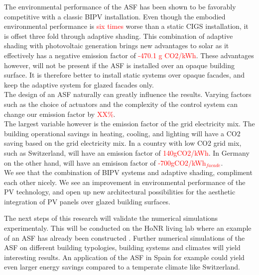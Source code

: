 
The environmental performance of the ASF has been shown to be favorably competitive with a classic BIPV installation. Even though the embodied environmental performance is \textcolor{red}{six times} worse than a static CIGS installation, it is offset three fold through adaptive shading. This combination of adaptive shading with photovoltaic generation brings new advantages to solar as it effectively has a negative emission factor of \textcolor{red}{-470.1 g CO2/kWh}. These advantages however, will not be present if the ASF is installed over an opaque building surface. It is therefore better to install static systems over opaque facades, and keep the adaptive system for glazed facades only. \\

The design of an ASF naturally can greatly influence the results. Varying factors such as the choice of actuators and the complexity of the control system can change our emission factor by \textcolor{red}{XX\%}.\\
The largest variable however is the emission factor of the grid electricity mix. The building operational savings in heating, cooling, and lighting will have a CO2 saving based on the grid electricity mix. In a country with low CO2 grid mix, such as Switzerland, will have an emission factor of \textcolor{red}{140gCO2/kWh}. In Germany on the other hand, will have an emisison factor of \textcolor{red}{-700gCO2/kWh$_{facade}$}.\\

We see that the combination of BIPV systems and adaptive shading, compliment each other nicely. We see an improvement in environmental performance of the PV technology, and open up new architectural possibilities for the aesthetic integration of PV panels over glazed building surfaces. 

The next steps of this research will validate the numerical simulations experimentaly. This will be conducted on the HoNR living lab where an example of an ASF has already been constructed \cite{nagy2015frontiers}. Further numerical simulations of the ASF on different building typologies, building systems and climates will yield interesting results. An application of the ASF in Spain for example could yield even larger energy savings compared to a temperate climate like Switzerland.


